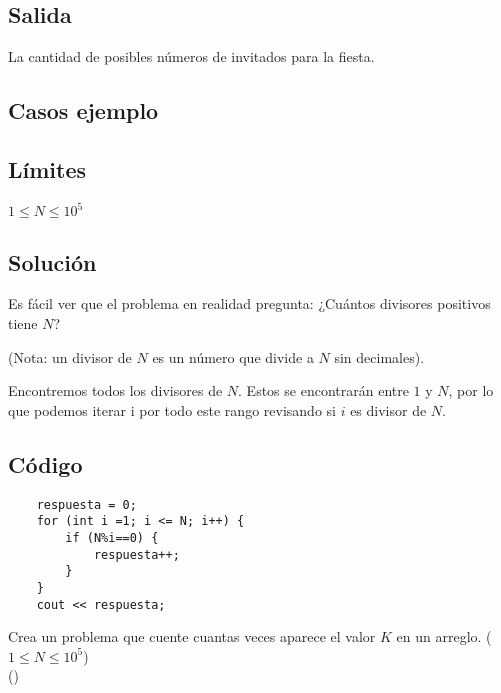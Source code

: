 \subsection*{Salida}
La cantidad de posibles números de invitados para la fiesta.
\subsection*{Casos ejemplo}
\begin{casebox2}
\end{casebox2}
\subsection*{Límites}
\begin{plimits}
	\item \(1\leq N \leq 10^5\)
\end{plimits}

\subsection*{Solución}
Es fácil ver que el problema en realidad pregunta: ¿Cuántos divisores positivos tiene \(N\)?

(Nota: un divisor de \(N\) es un número que divide a \(N\) sin decimales).

Encontremos todos los divisores de \(N\). Estos se encontrarán entre \(1\) y \(N\), por lo que podemos iterar i por todo este rango revisando si \(i\) es divisor de \(N\).
\subsection*{Código}
\begin{lstlisting}
	respuesta = 0;
	for (int i =1; i <= N; i++) {
		if (N%i==0) {
			respuesta++;
		}
	}
	cout << respuesta;
\end{lstlisting}

\begin{exercise}
	Crea un problema que cuente cuantas veces aparece el valor \(K\) en un arreglo.
	(\(1\leq N \leq 10^5\))\\
	()
\end{exercise}